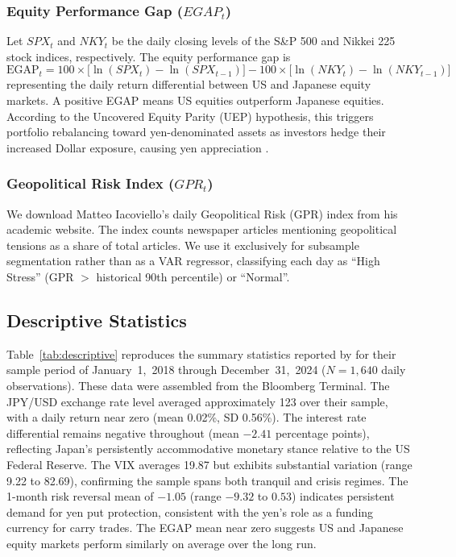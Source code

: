 \documentclass[12pt]{article}
\begin{document}
\subsubsection{Equity Performance Gap ($EGAP_t$)}
{} Let $SPX_t$ and $NKY_t$ be the daily closing levels of the S\&P 500 and Nikkei 225 stock indices, respectively. The equity performance gap is \begin{equation} \text{EGAP}_t = 100 \times \big[ \ln(SPX_t) - \ln(SPX_{t-1}) \big] - 100 \times \big[ \ln(NKY_t) - \ln(NKY_{t-1}) \big] \end{equation} representing the daily return differential between US and Japanese equity markets. A positive EGAP means US equities outperform Japanese equities. According to the Uncovered Equity Parity (UEP) hypothesis, this triggers portfolio rebalancing toward yen-denominated assets as investors hedge their increased Dollar exposure, causing yen appreciation \parencite{hau2006exchange, kim2011risk}.

\subsubsection{Geopolitical Risk Index ($GPR_t$)}
{} We download Matteo Iacoviello's daily Geopolitical Risk (GPR) index from his academic website. The index counts newspaper articles mentioning geopolitical tensions as a share of total articles. We use it exclusively for subsample segmentation rather than as a VAR regressor, classifying each day as \textquotedblleft High Stress\textquotedblright{} (GPR $>$ historical 90th percentile) or \textquotedblleft Normal\textquotedblright{}.

\subsection{Descriptive Statistics}

{} Table~\ref{tab:descriptive} reproduces the summary statistics reported by \textcite[Table~1]{guyot2026risk} for their sample period of January~1,~2018 through December~31,~2024 ($N = 1,\!640$ daily observations). These data were assembled from the Bloomberg Terminal. The JPY/USD exchange rate level averaged approximately 123 over their sample, with a daily return near zero (mean 0.02\%, SD 0.56\%). The interest rate differential remains negative throughout (mean $-2.41$ percentage points), reflecting Japan's persistently accommodative monetary stance relative to the US Federal Reserve. The VIX averages 19.87 but exhibits substantial variation (range 9.22 to 82.69), confirming the sample spans both tranquil and crisis regimes. The 1-month risk reversal mean of $-1.05$ (range $-9.32$ to $0.53$) indicates persistent demand for yen put protection, consistent with the yen's role as a funding currency for carry trades. The EGAP mean near zero suggests US and Japanese equity markets perform similarly on average over the long run.
\end{document}
